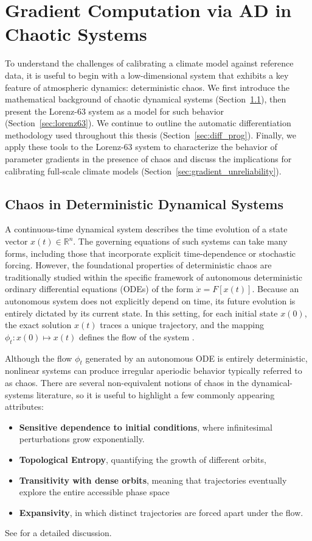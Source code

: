 \chapter{Gradient Computation via AD in Chaotic Systems}
\label{chap:lorenz63}

To understand the challenges of calibrating a climate model against reference data, it is useful to begin with a low-dimensional system that exhibits a key feature of atmospheric dynamics: deterministic chaos. We first introduce the mathematical background of chaotic dynamical systems (Section~\ref{sec:chaos}), then present the Lorenz-63 system as a model for such behavior (Section~\ref{sec:lorenz63}). We continue to outline the automatic differentiation methodology used throughout this thesis (Section~\ref{sec:diff_prog}). Finally, we apply these tools to the Lorenz-63 system to characterize the behavior of parameter gradients in the presence of chaos and discuss the implications for calibrating full-scale climate models (Section~\ref{sec:gradient_unreliability}).

\section{Chaos in Deterministic Dynamical Systems}
\label{sec:chaos}
A continuous-time dynamical system describes the time evolution of a state vector $x(t) \in \mathbb{R}^n$. The governing equations of such systems can take many forms, including those that incorporate explicit time-dependence or stochastic forcing. However, the foundational properties of deterministic chaos are traditionally studied within the specific framework of autonomous deterministic ordinary differential equations (ODEs) of the form $\dot{x} = F[x(t)]$. Because an autonomous system does not explicitly depend on time, its future evolution is entirely dictated by its current state. In this setting, for each initial state $x(0)$, the exact solution $x(t)$ traces a unique trajectory, and the mapping $\phi_t:x(0)\mapsto x(t)$ defines the flow of the system \parencite[Ch.~1.3]{ott_chaos_2002}.

Although the flow $\phi_t$ generated by an autonomous ODE is entirely deterministic, nonlinear systems can produce irregular aperiodic behavior typically referred to as chaos. There are several non-equivalent notions of chaos in the dynamical-systems literature, so it is useful to highlight a few commonly appearing attributes:

\begin{itemize}
    \item \textbf{Sensitive dependence to initial conditions}, where infinitesimal perturbations grow exponentially.
    \item \textbf{Topological Entropy}, quantifying the growth of different orbits,
    \item \textbf{Transitivity with dense orbits}, meaning that trajectories eventually explore the entire accessible phase space
    \item \textbf{Expansivity}, in which distinct trajectories are forced apart under the flow.
\end{itemize}
See \textcite{effah-poku_study_2018} for a detailed discussion. 

